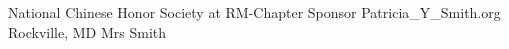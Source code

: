 

\begin{cvhonors}

  \cvreferences
    {National Chinese Honor Society at RM-Chapter Sponsor} %
    {Patricia\_Y\_Smith\@mcpsmd.org} %
    {Rockville, MD} %
    {Mrs Smith} %

\end{cvhonors}
